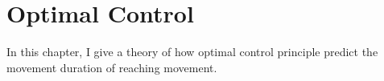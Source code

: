 \chapter{Optimal Control}
\label{cha:research_topic_1}

In this chapter, I give a theory of how optimal control principle predict the movement duration of reaching movement.
